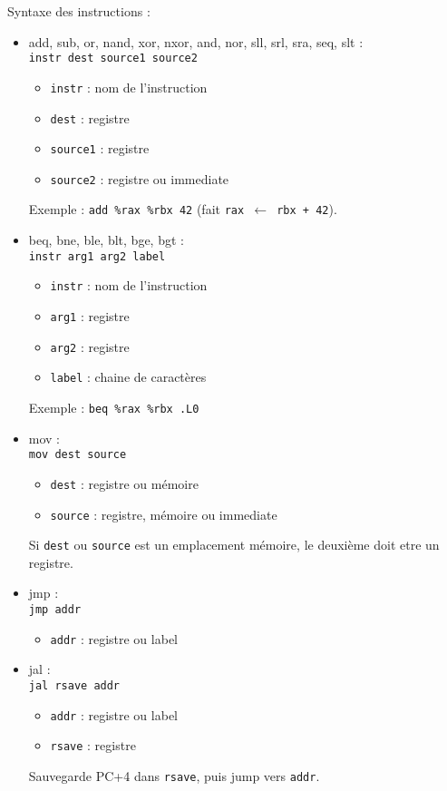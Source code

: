 \documentclass[a4paper]{article}
\begin{document}
    Syntaxe des instructions :
    \begin{itemize}
        \item add, sub, or, nand, xor, nxor, and, nor, sll, srl, sra, seq, slt :\\
        \texttt{instr dest source1 source2}
        \begin{itemize}
            \item \texttt{instr} : nom de l'instruction
            \item \texttt{dest} : registre
            \item \texttt{source1} : registre
            \item \texttt{source2} : registre ou immediate
        \end{itemize}
        Exemple : \texttt{add \%rax \%rbx 42} 
        (fait \texttt{rax $\leftarrow$ rbx + 42}).
        
        \item beq, bne, ble, blt, bge, bgt :\\
        \texttt{instr arg1 arg2 label}
        \begin{itemize}
            \item \texttt{instr} : nom de l'instruction
            \item \texttt{arg1} : registre
            \item \texttt{arg2} : registre
            \item \texttt{label} : chaine de caractères 
        \end{itemize}
        Exemple : \texttt{beq \%rax \%rbx .L0} 
        
        \item mov :\\
        \texttt{mov dest source}
        \begin{itemize}
            \item \texttt{dest} : registre ou mémoire
            \item \texttt{source} : registre, mémoire ou immediate
        \end{itemize}
        Si \texttt{dest} ou \texttt{source} est un emplacement mémoire, le deuxième doit etre un registre.

        \item jmp :\\
        \texttt{jmp addr}
        \begin{itemize}
            \item \texttt{addr} : registre ou label
        \end{itemize}

        \item jal :\\
        \texttt{jal rsave addr}
        \begin{itemize}
            \item \texttt{addr} : registre ou label
            \item \texttt{rsave} : registre
        \end{itemize}
        Sauvegarde PC+4 dans \texttt{rsave}, puis jump vers \texttt{addr}.
    \end{itemize}
\end{document}
